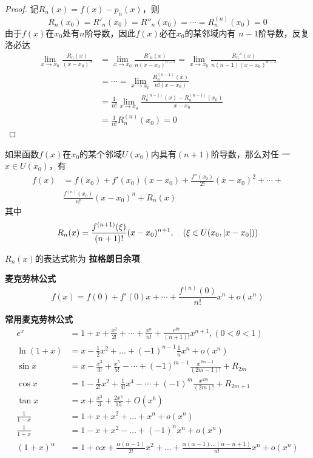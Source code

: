 \documentclass[11pt]{article}
\begin{document}
\begin{proof}
记\(R_n(x)=f(x)-p_n(x)\)，则
\begin{equation*}
R_n(x_0)=R'_n(x_0)=R''_n(x_0)=\cdots=R_n^{(n)}(x_0)=0
\end{equation*}
由于\(f(x)\)在\(x_0\)处有\(n\)阶导数，因此\(f(x)\)必在\(x_0\)的某邻域内有
\(n-1\)阶导数，反复洛必达
\begin{align*}
\lim_{x\to x_0}\frac{R_n(x)}{(x-x_0)^n}&=
\lim_{x\to x_0}\frac{R'_n(x)}{n(x-x_0)^{n-1}}=
\lim_{x\to x_0}\frac{R_n''(x)}{n(n-1)(x-x_0)^{n-2}}\\
&=\cdots=\lim_{x\to x_0}\frac{R^{(n-1)}_n(x)}{n!(x-x_0)}\\
&=\frac{1}{n!}\lim_{x\to x_0}\frac{R_n^{(n-1)}(x)-R_n^{(n-1)}(x_0)}{x-x_0}\\
&=\frac{1}{n!}R_n^{(n)}(x_0)=0
\end{align*}
\end{proof}

\begin{theorem}[泰勒中值定理 2]
如果函数\(f(x)\)在\(x_0\)的某个邻域\(U(x_0)\)内具有\((n+1)\)阶导数，那么对任
一\(x\in U(x_0)\)，有
\begin{align*}
f(x)&=f(x_0)+f'(x_0)(x-x_0)+\frac{f''(x_0)}{2!}(x-x_0)^2+\cdots+\\
&\frac{f^{(n)}(x_0)}{n!}(x-x_0)^n+R_n(x)
\end{align*}
其中
\begin{equation*}
R_n(x)=\frac{f^{(n+1)}(\xi)}{(n+1)!}(x-x_0)^{n+1},\quad (\xi\in U(x_0,\abs{x-x_0}))
\end{equation*}
\end{theorem}

\(R_n(x)\)的表达式称为 \textbf{拉格朗日余项}

\textbf{麦克劳林公式}
\begin{equation*}
f(x)=f(0)+f'(0)x+\cdots+\frac{f^{(n)}(0)}{n!}x^n+o(x^n)
\end{equation*}

\textbf{常用麦克劳林公式}
\begin{align*}
e^x&=1+x+\frac{x^2}{2!}+\cdots+\frac{x^n}{n!}+\frac{e^{\theta x}}{(n+1)!}x^{n+1},(0<\theta<1)\\
\ln(1+x)&=x-\frac{1}{2}x^2+\dots+(-1)^{n-1}\frac{1}{n}x^n+o(x^n)\\
\sin x&=x-\frac{x^3}{3!}+\frac{x^5}{5!}-\cdots+(-1)^{m-1}\frac{x^{2m-1}}{(2m-1)!}+R_{2m}\\
\cos x&=1-\frac{1}{2!}x^2+\frac{1}{4!}x^4-\cdots+(-1)^m\frac{x^{2m}}{(2m)!}+R_{2m+1}\\
\tan x&=x+\frac{x^3}{3}+\frac{2x^5}{15}+O(x^6)\\
\frac{1}{1-x}&=1+x+x^2+\dots+x^n+o(x^n)\\
\frac{1}{1+x}&=1-x+x^2-\dots+(-1)^{n}x^n+o(x^n)\\
(1+x)^\alpha&=1+\alpha x+\frac{\alpha(\alpha-1)}{2!}x^2+\dots+
\frac{\alpha(\alpha-1)\dots(\alpha-n+1)}{n!}x^n+o(x^n)
\end{align*}
\end{document}
